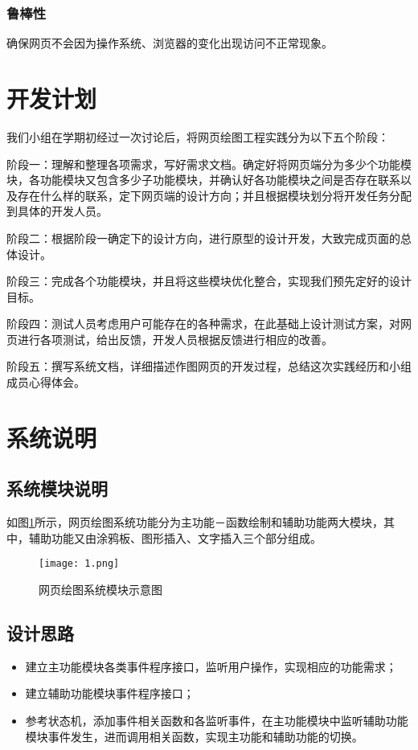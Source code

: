 \documentclass[lang=cn]{elegantpaper}
\begin{document}
\subsubsection{鲁棒性}
确保网页不会因为操作系统、浏览器的变化出现访问不正常现象。

\section{开发计划}
我们小组在学期初经过一次讨论后，将网页绘图工程实践分为以下五个阶段：


阶段一：理解和整理各项需求，写好需求文档。确定好将网页端分为多少个功能模块，各功能模块又包含多少子功能模块，并确认好各功能模块之间是否存在联系以及存在什么样的联系，定下网页端的设计方向；并且根据模块划分将开发任务分配到具体的开发人员。

阶段二：根据阶段一确定下的设计方向，进行原型的设计开发，大致完成页面的总体设计。

阶段三：完成各个功能模块，并且将这些模块优化整合，实现我们预先定好的设计目标。

阶段四：测试人员考虑用户可能存在的各种需求，在此基础上设计测试方案，对网页进行各项测试，给出反馈，开发人员根据反馈进行相应的改善。

阶段五：撰写系统文档，详细描述作图网页的开发过程，总结这次实践经历和小组成员心得体会。


\section{系统说明}
\subsection{系统模块说明}


如图\ref{1img}所示，网页绘图系统功能分为主功能－函数绘制和辅助功能两大模块，其中，辅助功能又由涂鸦板、图形插入、文字插入三个部分组成。
\begin{figure}[htbp]
	\centering
	\texttt{[image: 1.png]}
	\caption{网页绘图系统模块示意图}
	\label{1img}
\end{figure}

\subsection{设计思路}
\begin{itemize}
	\item [(1)]建立主功能模块各类事件程序接口，监听用户操作，实现相应的功能需求；
	\item [(2)]建立辅助功能模块事件程序接口；
	\item [(3)]参考状态机，添加事件相关函数和各监听事件，在主功能模块中监听辅助功能模块事件发生，进而调用相关函数，实现主功能和辅助功能的切换。
\end{itemize}
\end{document}
